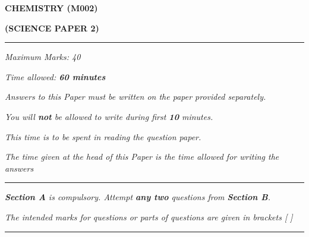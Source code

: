 \begin{center}
   \Large
   \textbf{CHEMISTRY (M002)}

   \textbf{(SCIENCE PAPER 2)}
   \rule{\textwidth}{0.4pt}
   \normalsize
   \textit{Maximum Marks: 40}

   \textit{Time allowed: \textbf{60 minutes}}

   \textit{Answers to this Paper must be written on the paper provided separately.}

   \textit{You will \textbf{not} be allowed to write during first \textbf{10} minutes.}

   \textit{This time is to be spent in reading the question paper.}

   \textit{The time given at the head of this Paper is the time allowed for writing the answers}
   \rule{\textwidth}{0.4pt}
   \small

   \textit{\textbf{Section A} is compulsory. Attempt \textbf{any two} questions from \textbf{Section B}.}

   \textit{The intended marks for questions or parts of questions are given in brackets [ ]}
   \rule{\textwidth}{0.4pt}
\end{center}
